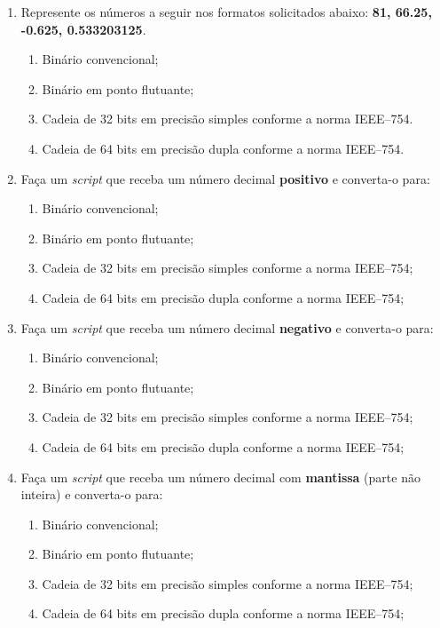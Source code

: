 \documentclass[12pt]{elsarticle}
\begin{document}
	
\begin{enumerate}
\section*{Conversão - norma IEEE 754/2008}

\item Represente os números a seguir nos formatos solicitados abaixo: 
{\bf 81, 66.25, -0.625, 0.533203125}.
    \begin{enumerate}
        \item Binário convencional;
        \item Binário em ponto flutuante;
        \item Cadeia de 32 bits em precisão simples conforme a norma IEEE--754.
        \item Cadeia de 64 bits em precisão dupla conforme a norma IEEE--754.
    \end{enumerate}
    
\item Faça um {\it script} que receba um número decimal {\bf positivo} e converta-o para:
    \begin{enumerate}
        \item Binário convencional;
        \item Binário em ponto flutuante;
        \item Cadeia de 32 bits em precisão simples conforme a norma IEEE--754;
        \item Cadeia de 64 bits em precisão dupla conforme a norma IEEE--754;
    \end{enumerate}
    
\item Faça um {\it script} que receba um número decimal {\bf negativo} e converta-o para:
	\begin{enumerate}
        \item Binário convencional;
        \item Binário em ponto flutuante;
        \item Cadeia de 32 bits em precisão simples conforme a norma IEEE--754;
        \item Cadeia de 64 bits em precisão dupla conforme a norma IEEE--754;
    \end{enumerate}
    
\item Faça um {\it script} que receba um número decimal com {\bf mantissa} (parte não inteira) e converta-o para:
	\begin{enumerate}
        \item Binário convencional;
        \item Binário em ponto flutuante;
        \item Cadeia de 32 bits em precisão simples conforme a norma IEEE--754;
        \item Cadeia de 64 bits em precisão dupla conforme a norma IEEE--754;
    \end{enumerate}


\end{enumerate}
\end{document}
